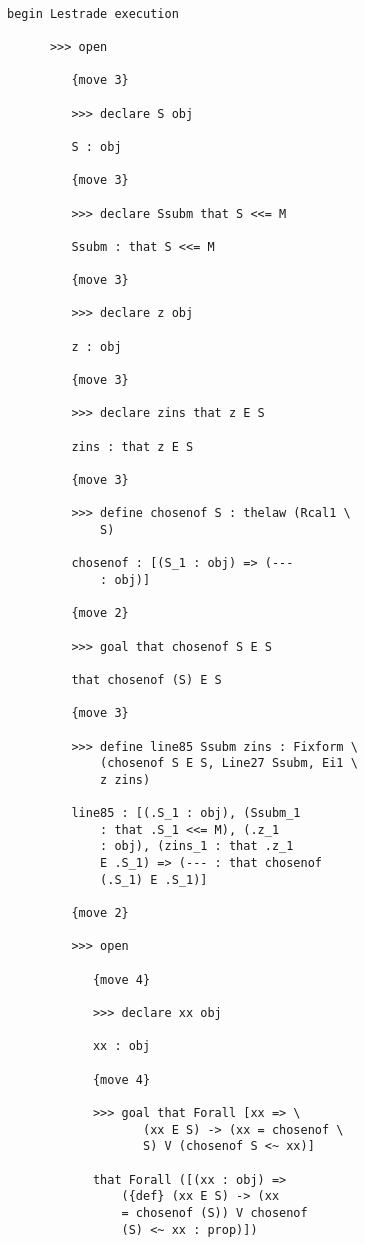 \documentclass[12pt]{article}
\begin{document}
\begin{verbatim}

begin Lestrade execution

      >>> open

         {move 3}

         >>> declare S obj

         S : obj

         {move 3}

         >>> declare Ssubm that S <<= M

         Ssubm : that S <<= M

         {move 3}

         >>> declare z obj

         z : obj

         {move 3}

         >>> declare zins that z E S

         zins : that z E S

         {move 3}

         >>> define chosenof S : thelaw (Rcal1 \
             S)

         chosenof : [(S_1 : obj) => (--- 
             : obj)]

         {move 2}

         >>> goal that chosenof S E S

         that chosenof (S) E S

         {move 3}

         >>> define line85 Ssubm zins : Fixform \
             (chosenof S E S, Line27 Ssubm, Ei1 \
             z zins)

         line85 : [(.S_1 : obj), (Ssubm_1 
             : that .S_1 <<= M), (.z_1 
             : obj), (zins_1 : that .z_1 
             E .S_1) => (--- : that chosenof 
             (.S_1) E .S_1)]

         {move 2}

         >>> open

            {move 4}

            >>> declare xx obj

            xx : obj

            {move 4}

            >>> goal that Forall [xx => \
                   (xx E S) -> (xx = chosenof \
                   S) V (chosenof S <~ xx)]

            that Forall ([(xx : obj) => 
                ({def} (xx E S) -> (xx 
                = chosenof (S)) V chosenof 
                (S) <~ xx : prop)])


\end{verbatim}
\end{document}
